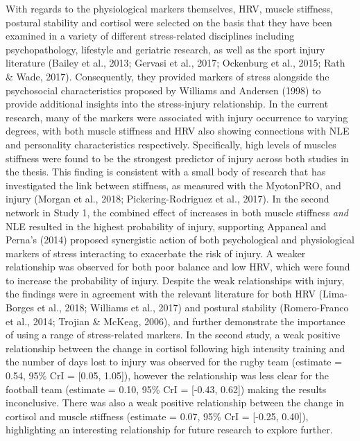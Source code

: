 \documentclass[man,floatsintext]{apa6}
\begin{document}
With regards to the physiological markers themselves, HRV, muscle stiffness, postural stability and cortisol were selected on the basis that they have been examined in a variety of different stress-related disciplines including psychopathology, lifestyle and geriatric research, as well as the sport injury literature (Bailey et al., 2013; Gervasi et al., 2017; Ockenburg et al., 2015; Rath \& Wade, 2017).
Consequently, they provided markers of stress alongside the psychosocial characteristics proposed by Williams and Andersen (1998) to provide additional insights into the stress-injury relationship.
In the current research, many of the markers were associated with injury occurrence to varying degrees, with both muscle stiffness and HRV also showing connections with NLE and personality characteristics respectively.
Specifically, high levels of muscles stiffness were found to be the strongest predictor of injury across both studies in the thesis.
This finding is consistent with a small body of research that has investigated the link between stiffness, as measured with the MyotonPRO, and injury (Morgan et al., 2018; Pickering-Rodriguez et al., 2017).
In the second network in Study 1, the combined effect of increases in both muscle stiffness \emph{and} NLE resulted in the highest probability of injury, supporting Appaneal and Perna's (2014) proposed synergistic action of both psychological and physiological markers of stress interacting to exacerbate the risk of injury.
A weaker relationship was observed for both poor balance and low HRV, which were found to increase the probability of injury.
Despite the weak relationships with injury, the findings were in agreement with the relevant literature for both HRV (Lima-Borges et al., 2018; Williams et al., 2017) and postural stability (Romero-Franco et al., 2014; Trojian \& McKeag, 2006), and further demonstrate the importance of using a range of stress-related markers.
In the second study, a weak positive relationship between the change in cortisol following high intensity training and the number of days lost to injury was observed for the rugby team (estimate = 0.54, 95\% CrI = {[}0.05, 1.05{]}), however the relationship was less clear for the football team (estimate = 0.10, 95\% CrI = {[}-0.43, 0.62{]}) making the results inconclusive.
There was also a weak positive relationship between the change in cortisol and muscle stiffness (estimate = 0.07, 95\% CrI = {[}-0.25, 0.40{]}), highlighting an interesting relationship for future research to explore further.
\end{document}
